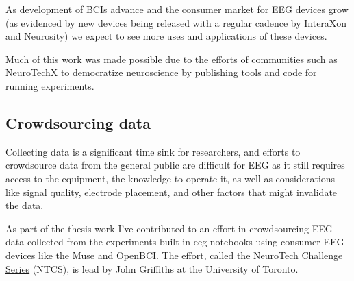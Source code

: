
    As development of BCIs advance and the consumer market for EEG devices grow (as evidenced by new devices being released with a regular cadence by InteraXon and Neurosity) we expect to see more uses and applications of these devices.

    Much of this work was made possible due to the efforts of communities such as NeuroTechX to democratize neuroscience by publishing tools and code for running experiments.

\subsection{Crowdsourcing data}

    Collecting data is a significant time sink for researchers, and efforts to crowdsource data from the general public are difficult for EEG as it still requires access to the equipment, the knowledge to operate it, as well as considerations like signal quality, electrode placement, and other factors that might invalidate the data.

    As part of the thesis work I've contributed to an effort in crowdsourcing EEG data collected from the experiments built in eeg-notebooks using consumer EEG devices like the Muse and OpenBCI\@. The effort, called the \href{https://neurotech-challenge.com/}{NeuroTech Challenge Series} (NTCS), is lead by John Griffiths at the University of Toronto.


